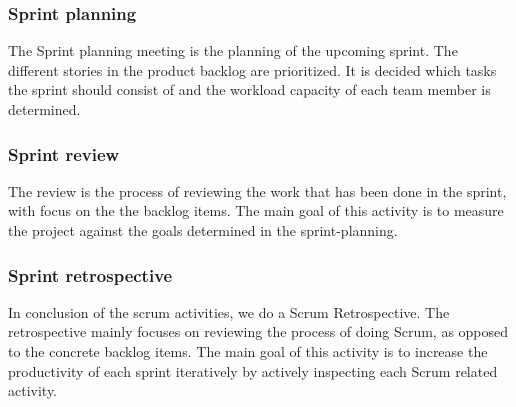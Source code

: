 \subsubsection{Sprint planning}
The Sprint planning meeting is the planning of the upcoming sprint. The different stories in the product backlog are prioritized. It is decided which tasks the sprint should consist of and the workload capacity of each team member is determined.
\subsubsection{Sprint review}
The review is the process of reviewing the work that has been done in the sprint, with focus on the the backlog items. The main goal of this activity is to measure the project against the goals determined in the sprint-planning.
\subsubsection{Sprint retrospective}
In conclusion of the scrum activities, we do a Scrum Retrospective. The retrospective mainly focuses on reviewing the process of doing Scrum, as opposed to the concrete backlog items. The main goal of this activity is to increase the productivity of each sprint iteratively by actively inspecting each Scrum related activity.